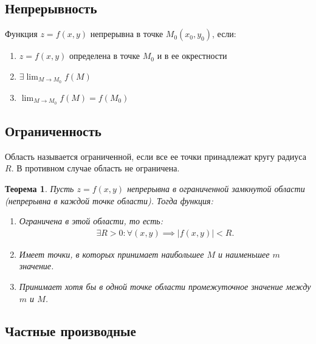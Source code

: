 \documentclass[a4paper,12pt,oneside]{extbook}
\theoremstyle{numbered}
\theoremstyle{unnumbered}
\theoremstyle{named}
\newtheorem{theorem}{Теорема}[section]
\theoremstyle{unnumbered}
\theoremstyle{named}
\theoremstyle{named}
\theoremstyle{named}
\begin{document}
\subsection{Непрерывность}%
\label{sub:Непрерывность}

Функция \(z = f(x, y)\) непрерывна в точке \(M_0(x_0, y_0)\), если:
\begin{enumerate}
    \item {\(z = f(x, y)\) определена в точке \(M_0\) и в ее окрестности}
    \item {\(\exists \displaystyle \lim_{M \to M_0}{f(M)}\)}
    \item {\(\displaystyle \lim_{M \to M_0}{f(M)} = f(M_0)\)}
\end{enumerate}

\subsection{Ограниченность}%
\label{sub:Ограниченность}
\begin{siderules}
    Область называется ограниченной, если все ее точки принадлежат кругу радиуса \(R\). В противном случае область не ограничена.
\end{siderules}

\begin{theorem}
    Пусть \(z = f(x, y)\) непрерывна в ограниченной замкнутой области (непрерывна в каждой точке области). Тогда функция:
    \begin{enumerate}
        \item {
              Ограничена в этой области, то есть:
              \begin{gather*}
                  \exists R > 0 : \forall (x, y) \implies |f(x, y)| < R.
              \end{gather*}
              }
        \item {
              Имеет точки, в которых принимает наибольшее \(M\) и наименьшее \(m\) значение.
              }
        \item {
              Принимает хотя бы в одной точке области промежуточное значение между \(m\) и \(M\).
              }
    \end{enumerate}
\end{theorem}


\subsection{Частные производные}%
\label{sub:Частные производные}
\end{document}
